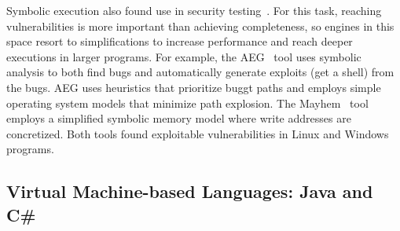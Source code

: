 

Symbolic execution also found use in security testing~\cite{aeg,mayhem,bitBlaze}.  For this task, reaching vulnerabilities is more important than achieving completeness, so engines in this space resort to simplifications to increase performance and reach deeper executions in larger programs.
%
For example, the AEG~\cite{aeg} tool uses symbolic analysis to both find bugs and automatically generate exploits (get a shell) from the bugs.  AEG uses heuristics that prioritize buggt paths and employs simple operating system models that minimize path explosion.
%
The Mayhem~\cite{mayhem} tool employs a simplified symbolic memory model where write addresses are concretized.
%
Both tools found exploitable vulnerabilities in Linux and Windows programs.


\subsection{Virtual Machine-based Languages: Java and C\#}




